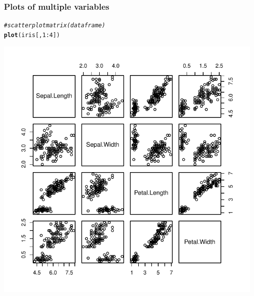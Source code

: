 \documentclass[12pt]{beamer}\usepackage[]{graphicx}\usepackage[]{color}
\makeatletter
\newcommand{\hlnum}[1]{\textcolor[rgb]{0.686,0.059,0.569}{#1}}%
\newcommand{\hlcom}[1]{\textcolor[rgb]{0.678,0.584,0.686}{\textit{#1}}}%
\newcommand{\hlopt}[1]{\textcolor[rgb]{0,0,0}{#1}}%
\newcommand{\hlstd}[1]{\textcolor[rgb]{0.345,0.345,0.345}{#1}}%
\newcommand{\hlkwd}[1]{\textcolor[rgb]{0.737,0.353,0.396}{\textbf{#1}}}%
\newenvironment{kframe}{%
 \def\at@end@of@kframe{}%
 \ifinner\ifhmode%
  \def\at@end@of@kframe{\end{minipage}}%
  \begin{minipage}{\columnwidth}%
 \fi\fi%
 \def\FrameCommand##1{\hskip\@totalleftmargin \hskip-\fboxsep
 \colorbox{shadecolor}{##1}\hskip-\fboxsep
     \hskip-\linewidth \hskip-\@totalleftmargin \hskip\columnwidth}%
 \MakeFramed {\advance\hsize-\width
   \@totalleftmargin\z@ \linewidth\hsize
   \@setminipage}}%
 {\par\unskip\endMakeFramed%
 \at@end@of@kframe}
\newenvironment{knitrout}{}{} %
\makeatother
\begin{document}
\begin{frame}[fragile]
\frametitle{Plots of multiple variables}
\begin{knitrout}\footnotesize
{}\color{fgcolor}\begin{kframe}
\begin{alltt}
\hlcom{# scatter plot matrix (data frame)}
\hlkwd{plot}\hlstd{(iris[ ,} \hlnum{1}\hlopt{:}\hlnum{4}\hlstd{])}
\end{alltt}
\end{kframe}

{\centering \includegraphics[width=.6\linewidth,height=.6\linewidth]{figure/unnamed-chunk-21-1} 

}



\end{knitrout}
\end{frame}

\end{document}
